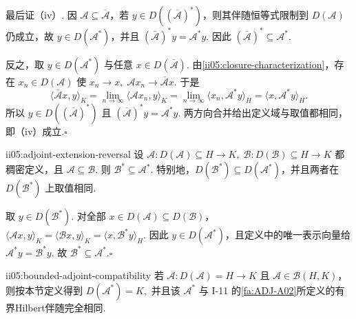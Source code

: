 \begin{FAProof}
最后证（iv）. 因 \(\displaystyle\mathcal A\subseteq\overline{\mathcal A}\)，若 \(\displaystyle y\in D((\overline{\mathcal A})^*)\)，则其伴随恒等式限制到 \(\displaystyle D(\mathcal A)\) 仍成立，故 \(\displaystyle y\in D(\mathcal A^*)\)，并且
\(\displaystyle (\overline{\mathcal A})^*y=\mathcal A^*y.\)
因此 \(\displaystyle(\overline{\mathcal A})^*\subseteq\mathcal A^*\).

反之，取 \(\displaystyle y\in D(\mathcal A^*)\) 与任意 \(\displaystyle x\in D(\overline{\mathcal A})\). 由\autoref{ii05:closure-characterization}，存在 \(\displaystyle x_n\in D(\mathcal A)\) 使
\(\displaystyle x_n\to x, \; \mathcal Ax_n\to\overline{\mathcal A}x.\)
于是
\[
\langle\overline{\mathcal A}x,y\rangle_K
=
\lim_{n\to\infty}\langle\mathcal Ax_n,y\rangle_K
=
\lim_{n\to\infty}\langle x_n,\mathcal A^*y\rangle_H
=
\langle x,\mathcal A^*y\rangle_H.
\]
所以 \(\displaystyle y\in D((\overline{\mathcal A})^*)\) 且 \(\displaystyle(\overline{\mathcal A})^*y=\mathcal A^*y\). 两方向合并给出定义域与取值都相同，即（iv）成立.\hfill\(\square\)
\end{FAProof}

\begin{FAProposition}[B][伴随反转延拓包含]{ii05:adjoint-extension-reversal}
设
\(\displaystyle \mathcal A:D(\mathcal A)\subseteq H\to K, \; \mathcal B:D(\mathcal B)\subseteq H\to K\)
都稠密定义，且 \(\displaystyle\mathcal A\subseteq\mathcal B\). 则
\(\displaystyle \mathcal B^*\subseteq\mathcal A^*.\)
特别地，\(\displaystyle D(\mathcal B^*)\subseteq D(\mathcal A^*)\)，并且两者在 \(\displaystyle D(\mathcal B^*)\) 上取值相同.
\end{FAProposition}

\begin{FAProof}
取 \(\displaystyle y\in D(\mathcal B^*)\). 对全部 \(\displaystyle x\in D(\mathcal A)\subseteq D(\mathcal B)\)，
\(\displaystyle \langle\mathcal Ax,y\rangle_K = \langle\mathcal Bx,y\rangle_K = \langle x,\mathcal B^*y\rangle_H.\)
因此 \(\displaystyle y\in D(\mathcal A^*)\)，且定义中的唯一表示向量给
\(\displaystyle \mathcal A^*y=\mathcal B^*y.\)
故 \(\displaystyle\mathcal B^*\subseteq\mathcal A^*\).\hfill\(\square\)
\end{FAProof}

\begin{FAProposition}[B][与有界Hilbert伴随的兼容性]{ii05:bounded-adjoint-compatibility}
若
\(\displaystyle \mathcal A:D(\mathcal A)=H\to K\)
且 \(\displaystyle\mathcal A\in\mathcal B(H,K)\)，则按本节定义得到
\(\displaystyle D(\mathcal A^*)=K,\)
并且该 \(\displaystyle\mathcal A^*\) 与 I-11 的\autoref{fa:ADJ-A02}所定义的有界Hilbert伴随完全相同.
\end{FAProposition}

